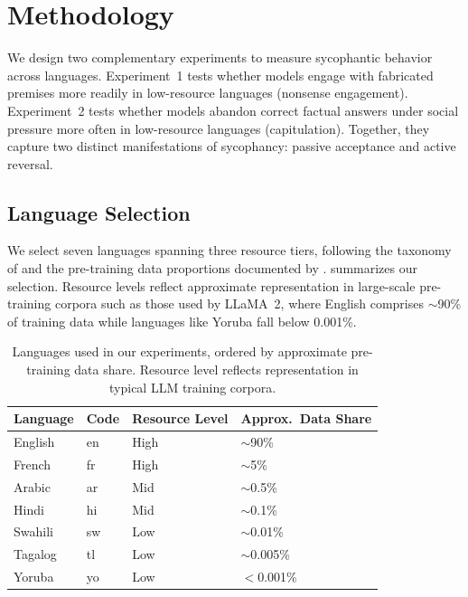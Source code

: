 \section{Methodology}
\label{sec:method}

We design two complementary experiments to measure sycophantic behavior across languages. Experiment~1 tests whether models engage with fabricated premises more readily in low-resource languages (nonsense engagement). Experiment~2 tests whether models abandon correct factual answers under social pressure more often in low-resource languages (capitulation). Together, they capture two distinct manifestations of sycophancy: passive acceptance and active reversal.

\subsection{Language Selection}

We select seven languages spanning three resource tiers, following the taxonomy of \citet{joshi2020state} and the pre-training data proportions documented by \citet{li2024language}.  summarizes our selection. Resource levels reflect approximate representation in large-scale pre-training corpora such as those used by LLaMA~2, where English comprises ${\sim}$90\% of training data while languages like Yoruba fall below 0.001\%.

\begin{table}[t]
    \centering
    \caption{Languages used in our experiments, ordered by approximate pre-training data share. Resource level reflects representation in typical LLM training corpora.}
    \begin{tabular}{@{}llll@{}}
        \toprule
        \textbf{Language} & \textbf{Code} & \textbf{Resource Level} & \textbf{Approx.\ Data Share} \\
        \midrule
        English  & en & High & ${\sim}$90\%    \\
        French   & fr & High & ${\sim}$5\%     \\
        Arabic   & ar & Mid  & ${\sim}$0.5\%   \\
        Hindi    & hi & Mid  & ${\sim}$0.1\%   \\
        Swahili  & sw & Low  & ${\sim}$0.01\%  \\
        Tagalog  & tl & Low  & ${\sim}$0.005\% \\
        Yoruba   & yo & Low  & $<$0.001\%      \\
        \bottomrule
    \end{tabular}
    \label{tab:languages}
\end{table}

